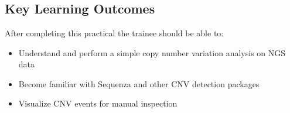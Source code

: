 



\chapter{\moduleTitle}


\newpage


\section{Key Learning Outcomes}

After completing this practical the trainee should be able to:

\begin{itemize}
  \item Understand and perform a simple copy number variation analysis on NGS data
  \item Become familiar with Sequenza and other CNV detection packages
  \item Visualize CNV events for manual inspection
\end{itemize}


